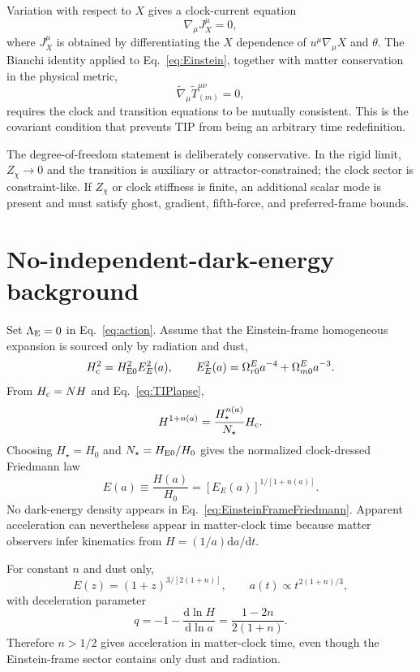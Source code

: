 \documentclass[aps,prd,reprint,nofootinbib,superscriptaddress,longbibliography]{revtex4-2}
\newcommand{\dd}{\mathrm{d}}
\newcommand{\Hc}{H_{\rm c}}
\begin{document}
Variation with respect to $X$ gives a clock-current equation
\begin{equation}
  \nabla_\mu J_X^\mu=0,
  \label{eq:Xcurrent}
\end{equation}
where $J_X^\mu$ is obtained by differentiating the $X$ dependence of $u^\mu\nabla_\mu X$ and $\theta$.  The Bianchi identity applied to Eq.~\eqref{eq:Einstein}, together with matter conservation in the physical metric,
\begin{equation}
  \tilde\nabla_\mu \tilde T^{\mu\nu}_{(m)}=0,
\end{equation}
requires the clock and transition equations to be mutually consistent.  This is the covariant condition that prevents TIP from being an arbitrary time redefinition.

The degree-of-freedom statement is deliberately conservative.  In the rigid limit, $Z_\chi\to0$ and the transition is auxiliary or attractor-constrained; the clock sector is constraint-like.  If $Z_\chi$ or clock stiffness is finite, an additional scalar mode is present and must satisfy ghost, gradient, fifth-force, and preferred-frame bounds.

\section{No-independent-dark-energy background}

Set $\Lambda_{\rm E}=0$ in Eq.~\eqref{eq:action}.  Assume that the Einstein-frame homogeneous expansion is sourced only by radiation and dust,
\begin{equation}
  \Hc^2=H_{\rm E0}^2 E_E^2(a),\qquad
  E_E^2(a)=\Omega^E_{r0}a^{-4}+\Omega^E_{m0}a^{-3} .
  \label{eq:EinsteinFrameFriedmann}
\end{equation}
From $\Hc=NH$ and Eq.~\eqref{eq:TIPlapse},
\begin{equation}
  H^{1+n(a)}=\frac{H_\star^{n(a)}}{N_\star}\Hc .
\end{equation}
Choosing $H_\star=H_0$ and $N_\star=H_{\rm E0}/H_0$ gives the normalized clock-dressed Friedmann law
\begin{equation}
  E(a)\equiv \frac{H(a)}{H_0}=\left[E_E(a)\right]^{1/[1+n(a)]} .
  \label{eq:clockfriedmann}
\end{equation}
No dark-energy density appears in Eq.~\eqref{eq:EinsteinFrameFriedmann}.  Apparent acceleration can nevertheless appear in matter-clock time because matter observers infer kinematics from $H=(1/a)\dd a/\dd t$.

For constant $n$ and dust only,
\begin{equation}
  E(z)=(1+z)^{3/[2(1+n)]},
  \qquad
  a(t)\propto t^{2(1+n)/3},
  \label{eq:constn}
\end{equation}
with deceleration parameter
\begin{equation}
  q=-1-\frac{\dd\ln H}{\dd\ln a}=\frac{1-2n}{2(1+n)} .
  \label{eq:qconstn}
\end{equation}
Therefore $n>1/2$ gives acceleration in matter-clock time, even though the Einstein-frame sector contains only dust and radiation.
\end{document}

